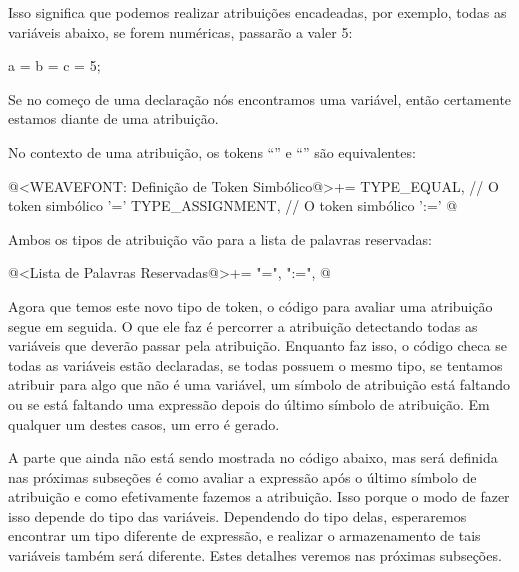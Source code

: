 Isso significa que podemos realizar atribuições encadeadas, por
exemplo, todas as variáveis abaixo, se forem numéricas, passarão a
valer 5:

\alinhaverbatim
a = b = c = 5;
\alinhanormal

Se no começo de uma declaração nós encontramos uma variável, então
certamente estamos diante de uma atribuição.

No contexto de uma atribuição, os tokens ``\monoespaco{=}'' e
``\monoespaco{:=}'' são equivalentes:

\iniciocodigo
@<WEAVEFONT: Definição de Token Simbólico@>+=
TYPE_EQUAL,            // O token simbólico '='
TYPE_ASSIGNMENT,       // O token simbólico ':='
@
\fimcodigo

Ambos os tipos de atribuição vão para a lista de palavras reservadas:

\iniciocodigo
@<Lista de Palavras Reservadas@>+=
"=", ":=",
@
\fimcodigo

Agora que temos este novo tipo de token, o código para avaliar uma
atribuição segue em seguida. O que ele faz é percorrer a atribuição
detectando todas as variáveis que deverão passar pela
atribuição. Enquanto faz isso, o código checa se todas as variáveis
estão declaradas, se todas possuem o mesmo tipo, se tentamos atribuir
para algo que não é uma variável, um símbolo de atribuição está
faltando ou se está faltando uma expressão depois do último símbolo de
atribuição. Em qualquer um destes casos, um erro é gerado.

A parte que ainda não está sendo mostrada no código abaixo, mas será
definida nas próximas subseções é como avaliar a expressão após o
último símbolo de atribuição e como efetivamente fazemos a
atribuição. Isso porque o modo de fazer isso depende do tipo das
variáveis. Dependendo do tipo delas, esperaremos encontrar um tipo
diferente de expressão, e realizar o armazenamento de tais variáveis
também será diferente. Estes detalhes veremos nas próximas subseções.

